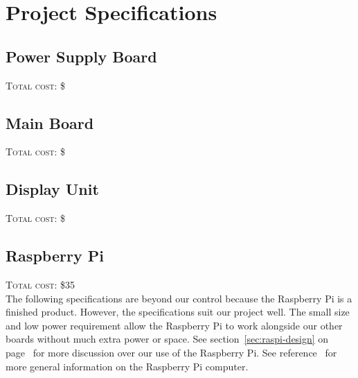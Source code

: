 \chapter{Project Specifications}





\section{Power Supply Board}
\textsc{Total cost: \$ }

\section{Main Board}
\textsc{Total cost: \$ }

\section{Display Unit}
\textsc{Total cost: \$ }

\section{Raspberry Pi}
\textsc{Total cost: \$35} \\

The following specifications are beyond our control because the Raspberry Pi
is a finished product. However, the specifications suit our project well. The
small size and low power requirement allow the Raspberry Pi to work alongside
our other boards without much extra power or space. See
section~\ref{sec:raspi-design} on page~\pageref{sec:raspi-design} for more
discussion over our use of the Raspberry Pi. See reference~\cite{raspifaq} for
more general information on the Raspberry Pi computer.

